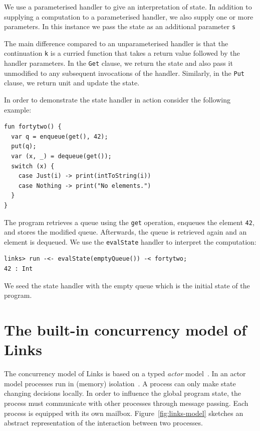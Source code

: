 \documentclass[12pt,mscres,cdtppar,twoside,openright,logo,rightchapter,normalheadings]{infthesis}
\theoremstyle{definition}
\begin{document}
We use a parameterised handler to give an interpretation of state.  In
addition to supplying a computation to a parameterised handler, we
also supply one or more parameters. In this instance we pass the state
as an additional parameter \lstinline$s$
%

%
The main difference compared to an unparameterised handler is that the
continuation \lstinline$k$ is a curried function that takes a return
value followed by the handler parameters. In the \lstinline$Get$
clause, we return the state and also pass it unmodified to any
subsequent invocations of the handler. Similarly, in the
\lstinline$Put$ clause, we return unit and update the state.

In order to demonstrate the state handler in action consider the
following example:
%
\begin{lstlisting}
fun fortytwo() {
  var q = enqueue(get(), 42);
  put(q);
  var (x, _) = dequeue(get());
  switch (x) {
    case Just(i) -> print(intToString(i))
    case Nothing -> print("No elements.")
  }
}
\end{lstlisting}
%
The program retrieves a queue using the \lstinline$get$ operation,
enqueues the element \lstinline$42$, and stores the modified
queue. Afterwards, the queue is retrieved again and an element is
dequeued.
%
We use the \lstinline$evalState$ handler to interpret the computation:
\begin{lstlisting}[style=terminal]
links> run -<- evalState(emptyQueue()) -< fortytwo;
42 : Int
\end{lstlisting}
We seed the state handler with the empty queue which is the initial
state of the program.

\section{The built-in concurrency model of Links}
\label{sec:links-model}

The concurrency model of Links is based on a typed \emph{actor}
model~\citep{Cooper2006}. In an actor model processes run in (memory)
isolation~\citep{Hewitt1977}. A process can only make state changing
decisions locally. In order to influence the global program state, the
process must communicate with other processes through message
passing. Each process is equipped with its own
mailbox. Figure~\ref{fig:links-model} sketches an abstract
representation of the interaction between two processes.
\end{document}
